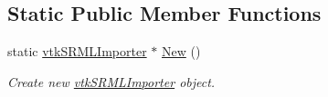 \subsection*{Static Public Member Functions}
\begin{DoxyCompactItemize}
\item 
\hypertarget{classvtkSRMLImporter_a8f4a15aba5778f358bdffd71f7b247bc}{
static \hyperlink{classvtkSRMLImporter}{vtkSRMLImporter} $\ast$ \hyperlink{classvtkSRMLImporter_a8f4a15aba5778f358bdffd71f7b247bc}{New} ()}
\label{classvtkSRMLImporter_a8f4a15aba5778f358bdffd71f7b247bc}

\begin{DoxyCompactList}\small\item\em Create new \hyperlink{classvtkSRMLImporter}{vtkSRMLImporter} object. \item\end{DoxyCompactList}\end{DoxyCompactItemize}
